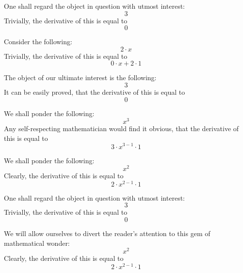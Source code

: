 \documentclass{article}
\begin{document}
One shall regard the object in question with utmost interest:
\begin{equation}
3 
\end{equation}
Trivially, the derivative of this is equal to
\begin{equation}
0 
\end{equation}

Consider the following:
\begin{equation}
2 \cdot x 
\end{equation}
Trivially, the derivative of this is equal to
\begin{equation}
0 \cdot x + 2 \cdot 1 
\end{equation}

The object of our ultimate interest is the following:
\begin{equation}
3 
\end{equation}
It can be easily proved, that the derivative of this is equal to
\begin{equation}
0 
\end{equation}

We shall ponder the following:
\begin{equation}
x ^{3 } 
\end{equation}
Any self-respecting mathematician would find it obvious, that the derivative of this is equal to
\begin{equation}
3 \cdot x ^{3 - 1 } \cdot 1 
\end{equation}

We shall ponder the following:
\begin{equation}
x ^{2 } 
\end{equation}
Clearly, the derivative of this is equal to
\begin{equation}
2 \cdot x ^{2 - 1 } \cdot 1 
\end{equation}

One shall regard the object in question with utmost interest:
\begin{equation}
3 
\end{equation}
Trivially, the derivative of this is equal to
\begin{equation}
0 
\end{equation}

We will allow ourselves to divert the reader's attention to this gem of mathematical wonder:
\begin{equation}
x ^{2 } 
\end{equation}
Clearly, the derivative of this is equal to
\begin{equation}
2 \cdot x ^{2 - 1 } \cdot 1 
\end{equation}
\end{document}
